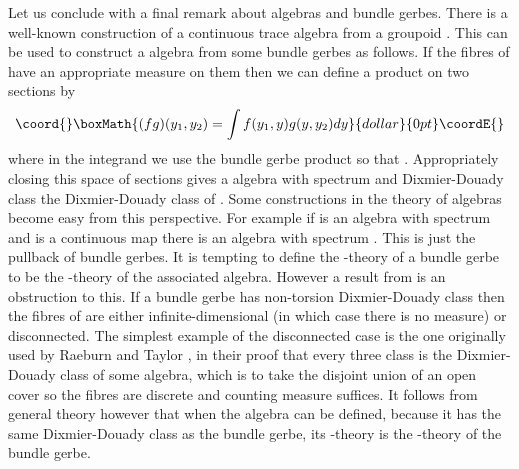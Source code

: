 \documentclass[a4paper,reqno]{amsart}
\theoremstyle{plain}
\theoremstyle{definition}
\theoremstyle{remark}
\numberwithin{equation}{section}
\numberwithin{figure}{section}
\providecommand{\<}{\langle}
\renewcommand{\>}{\rangle}
\begin{document}
Let us conclude with a final remark about \coordHE{} algebras and bundle gerbes.
There is a well-known construction of a continuous
trace  \coordHE{} algebra from
a groupoid \cite{Ren}.  This can be used to construct a \coordHE{} algebra
from some bundle gerbes as follows.  If the fibres of
       \coordHE{} have an appropriate measure on them then we can
define a product on two sections \coordHE{} by
$$\coord{}\boxMath{
(fg)(y_1, y_2) = \int f(y_1, y)g(y, y_2) dy
}{dollar}{0pt}\coordE{}$$
where in the integrand we use the bundle gerbe product so that
\coordHE{}.  Appropriately
closing this space of sections gives a \coordHE{} algebra with spectrum \coordHE{}
and Dixmier-Douady class the Dixmier-Douady class of \coordHE{}.
Some constructions in the theory of \coordHE{} algebras become easy from this
perspective. For example if \coordHE{} is an algebra with spectrum \coordHE{} and
\coordHE{}
is a continuous map there is an algebra \coordHE{} with spectrum \coordHE{}.
This is just the pullback of bundle gerbes.  It is tempting to define
the \coordHE{}-theory of a bundle gerbe to be the \coordHE{}-theory of the
associated \coordHE{} algebra.
However a result from \cite{Mur} is an obstruction to this. If a
bundle gerbe has non-torsion Dixmier-Douady class then the fibres of
\coordHE{} are either infinite-dimensional (in which case there is no
measure) or disconnected. The simplest example of the disconnected
case is the one originally used by Raeburn and Taylor \cite{RaeTay},
in their proof that every three class is the Dixmier-Douady class of
some \coordHE{} algebra, which is to take \coordHE{} the disjoint union of an
open cover so the fibres are discrete and counting measure
suffices. It follows from general theory however that when the \coordHE{}
algebra can be defined, because it has the same Dixmier-Douady class
as the bundle gerbe, its \coordHE{}-theory is the \coordHE{}-theory of the bundle
gerbe.
\end{document}
